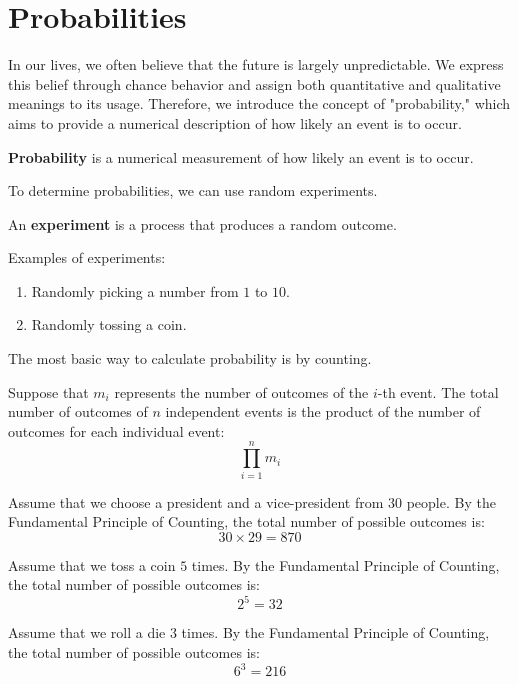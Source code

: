 \documentclass{huhtakm-template-book-v2}
\begin{document}
\section{Probabilities}
    In our lives, we often believe that the future is largely unpredictable. We express this belief through chance behavior and assign both quantitative and qualitative meanings to its usage. Therefore, we introduce the concept of "probability," which aims to provide a numerical description of how likely an event is to occur.
    \begin{defn}
        \textbf{Probability} is a numerical measurement of how likely an event is to occur.
    \end{defn}
    To determine probabilities, we can use random experiments.
    \begin{defn}
        An \textbf{experiment} is a process that produces a random outcome.
    \end{defn}
    \begin{eg}
        Examples of experiments:
        \begin{enumerate}
            \item Randomly picking a number from $1$ to $10$.
            \item Randomly tossing a coin.
        \end{enumerate}
    \end{eg}
    The most basic way to calculate probability is by counting.
    \begin{thm}
        Suppose that $m_{i}$ represents the number of outcomes of the $i$-th event. The total number of outcomes of $n$ independent events is the product of the number of outcomes for each individual event:
        \begin{equation*}
            \prod_{i = 1}^{n}m_{i}
        \end{equation*} 
    \end{thm}
    \begin{eg}
        Assume that we choose a president and a vice-president from $30$ people. By the Fundamental Principle of Counting, the total number of possible outcomes is:
        \begin{equation*}
            30\times 29 = 870
        \end{equation*}
    \end{eg}
    \begin{eg}
        Assume that we toss a coin $5$ times. By the Fundamental Principle of Counting, the total number of possible outcomes is:
        \begin{equation*}
            2^{5} = 32
        \end{equation*}
    \end{eg}
    \begin{eg}
        Assume that we roll a die $3$ times. By the Fundamental Principle of Counting, the total number of possible outcomes is:
        \begin{equation*}
            6^{3} = 216
        \end{equation*}
    \end{eg}
    \newpage
\end{document}
